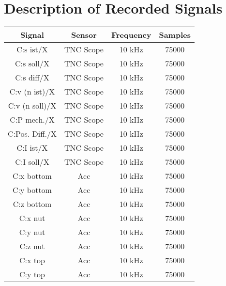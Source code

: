 \chapter{Description of Recorded Signals}



\begin{center}
\begin{longtable}{c c c c} 
 \toprule
 Signal & Sensor & Frequency & Samples \\ [0.5ex] 
 \midrule
 C:s ist/X & TNC Scope & 10 kHz & 75000 \\ 

 C:s soll/X & TNC Scope & 10 kHz & 75000 \\ 

 C:s diff/X & TNC Scope & 10 kHz & 75000 \\ 

 C:v (n ist)/X & TNC Scope & 10 kHz & 75000 \\ 

 C:v (n soll)/X& TNC Scope & 10 kHz & 75000 \\ 

 C:P mech./X & TNC Scope & 10 kHz & 75000 \\ 

 C:Pos. Diff./X & TNC Scope & 10 kHz & 75000 \\ 

 C:I ist/X & TNC Scope & 10 kHz & 75000 \\ 

 C:I soll/X & TNC Scope & 10 kHz & 75000 \\ 

 C:x bottom & Acc & 10 kHz & 75000 \\ 

 C:y bottom & Acc & 10 kHz & 75000 \\ 

 C:z bottom & Acc & 10 kHz & 75000 \\ 

 C:x nut & Acc & 10 kHz & 75000 \\ 

 C:y nut & Acc & 10 kHz & 75000 \\ 

 C:z nut & Acc & 10 kHz & 75000 \\ 

 C:x top & Acc & 10 kHz & 75000 \\ 

 C:y top & Acc & 10 kHz & 75000 \\ 


\end{longtable}
\end{center}
